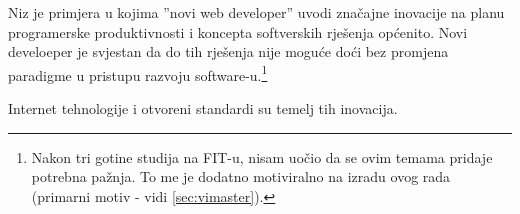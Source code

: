\documentclass[times, utf8, seminar]{fit}
\begin{document}
Niz je primjera u kojima ''novi web developer'' uvodi značajne inovacije na planu programerske produktivnosti i koncepta softverskih rješenja općenito. Novi develoeper je svjestan da do tih rješenja nije moguće doći bez promjena paradigme u pristupu razvoju software-u.\footnote{Nakon tri gotine studija na FIT-u, nisam uočio da se ovim temama pridaje potrebna pažnja. To me je dodatno motiviralno na izradu ovog rada (primarni motiv - vidi \ref{sec:vimaster}).}

Internet tehnologije i otvoreni standardi su temelj tih inovacija.



\end{document}
